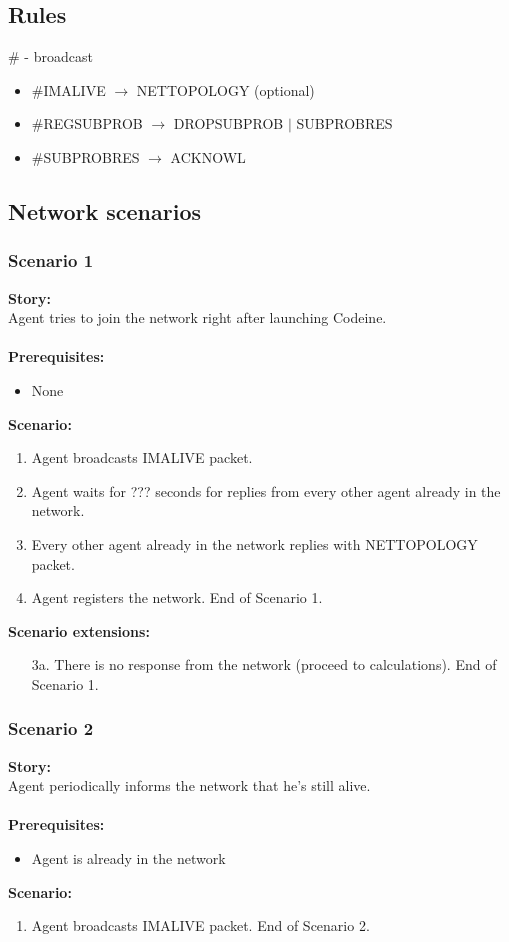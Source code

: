 \documentclass{article}
\begin{document}
\subsection{Rules}
\# - broadcast
\begin{itemize}
    \item \#{}IMALIVE $\rightarrow$ NETTOPOLOGY (optional)
    \item \#{}REGSUBPROB $\rightarrow$ DROPSUBPROB $\vert$ SUBPROBRES
    \item \#{}SUBPROBRES $\rightarrow$ ACKNOWL
\end{itemize}

\subsection{Network scenarios}
\subsubsection{Scenario 1}
\noindent\textbf{Story:} \\
Agent tries to join the network right after launching Codeine. \\\\
\textbf{Prerequisites:}
\begin{itemize}
    \item None
\end{itemize}
\textbf{Scenario:}
\begin{enumerate}
    \item Agent broadcasts IMALIVE packet.
    \item Agent waits for ??? seconds for replies from every other agent already in the network.
    \item Every other agent already in the network replies with NETTOPOLOGY packet.
    \item Agent registers the network. End of Scenario 1.
\end{enumerate}
\textbf{Scenario extensions:}
\begin{itemize}
    \item[3a.] There is no response from the network (proceed to calculations). End of Scenario 1.
\end{itemize}

\subsubsection{Scenario 2}
\noindent\textbf{Story:} \\
Agent periodically informs the network that he's still alive. \\\\
\textbf{Prerequisites:}
\begin{itemize}
    \item Agent is already in the network
\end{itemize}
\textbf{Scenario:}
\begin{enumerate}
    \item Agent broadcasts IMALIVE packet. End of Scenario 2.
\end{enumerate}
\end{document}
